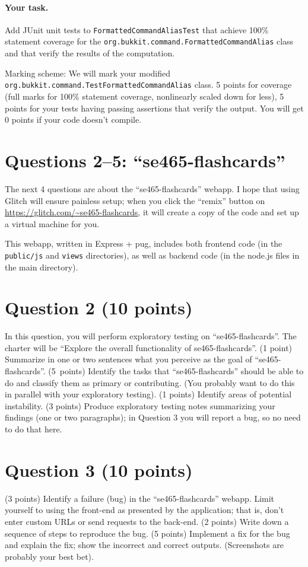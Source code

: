 \documentclass[10pt,hidelinks]{article}
\begin{document}
\paragraph{Your task.} Add JUnit unit tests to {\tt FormattedCommandAliasTest}
that achieve 100\% statement 
coverage for the {\tt org.bukkit.command.FormattedCommandAlias} class
and that verify the results of the computation.

Marking scheme: We will mark your modified {\tt
  org.bukkit.command.TestFormattedCommandAlias} class.  5 points for
coverage (full marks for 100\% statement coverage, nonlinearly scaled
down for less), 5 points for your tests having passing assertions that
verify the output. You will get 0 points if your code doesn't compile.

\section*{Questions 2--5: ``se465-flashcards''}
The next 4 questions are about the ``se465-flashcards'' webapp.
I hope that using Glitch will ensure painless setup; when you click the
``remix'' button on \url{https://glitch.com/~se465-flashcards},
it will create a copy of the code and set up a virtual machine for you.

This webapp, written in Express + pug, includes both frontend code (in
the {\tt public/js} and {\tt views} directories), as well as backend code
(in the node.js files in the main directory). 

\section*{Question 2 (10 points)}
In this question, you will perform exploratory testing on ``se465-flashcards''.
The charter will be ``Explore the overall functionality of
se465-flashcards''. (1 point) Summarize in one or two sentences what you
perceive as the goal of ``se465-flashcards''. (5~points) Identify the tasks
that ``se465-flashcards'' should be able to do and classify them as primary or
contributing. (You probably want to do this in parallel with your
exploratory testing). (1 points) Identify areas of potential
instability. (3 points) Produce exploratory testing notes summarizing
your findings (one or two paragraphs); in Question 3 you will report a
bug, so no need to do that here.

\section*{Question 3 (10 points)}
(3 points) Identify a failure (bug) in the ``se465-flashcards'' webapp.
Limit yourself to using the front-end as presented by the application; that is,
don't enter custom URLs or send requests to the back-end.
(2 points) Write down a sequence of
steps to reproduce the bug. (5 points) Implement a fix for the bug and explain the
fix; show the incorrect and correct outputs. (Screenshots are probably
your best bet).
\end{document}
